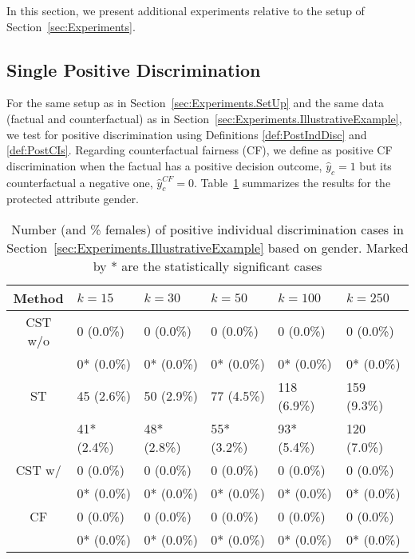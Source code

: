 In this section, we present additional experiments relative to the setup of Section~\ref{sec:Experiments}.

\subsection{Single Positive Discrimination}

For the same setup as in Section~\ref{sec:Experiments.SetUp} and the same data (factual and counterfactual) as in Section~\ref{sec:Experiments.IllustrativeExample}, we test for positive discrimination using Definitions \ref{def:PostIndDisc} and \ref{def:PostCIs}.
Regarding counterfactual fairness (CF), we define as positive CF discrimination when the factual has a positive decision outcome, $\hat{y}_c=1$ but its counterfactual a negative one, $\hat{y}_c^{CF}=0$.
Table~\ref{table:k-results_pos} summarizes the results for the protected attribute gender.

%
\begin{table}[t]
  \caption{Number (and \% females) of positive individual discrimination cases in Section~\ref{sec:Experiments.IllustrativeExample} based on gender. Marked by * are the statistically significant cases}
  \label{table:k-results_pos}
  \centering
  \begin{tabular}{clllll}
    \toprule
    Method & $k=15$ & $k=30$ & $k=50$ & $k=100$ & $k=250$\\
    \midrule
    CST w/o & 0 (0.0\%) & 0 (0.0\%) & 0 (0.0\%) & 0 (0.0\%)  & 0 (0.0\%) \\
     & 0* (0.0\%) & 0* (0.0\%) & 0* (0.0\%) & 0* (0.0\%)  & 0* (0.0\%) \\
     \midrule
    ST & 45 (2.6\%) & 50 (2.9\%) & 77 (4.5\%) & 118 (6.9\%) & 159 (9.3\%) \\
    & 41* (2.4\%) & 48* (2.8\%) & 55* (3.2\%) & 93* (5.4\%) & 120 (7.0\%) \\
    \midrule
    CST w/ & 0 (0.0\%) & 0 (0.0\%) & 0 (0.0\%) & 0 (0.0\%)  & 0 (0.0\%)\\
    & 0* (0.0\%) & 0* (0.0\%) & 0* (0.0\%) & 0* (0.0\%)  & 0* (0.0\%) \\
    \midrule
    CF & 0 (0.0\%) & 0 (0.0\%) & 0 (0.0\%) & 0 (0.0\%)  & 0 (0.0\%) \\
    & 0* (0.0\%) & 0* (0.0\%) & 0* (0.0\%) & 0* (0.0\%)  & 0* (0.0\%) \\
    \bottomrule
  \end{tabular}
\end{table}
%

